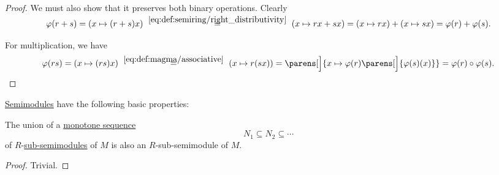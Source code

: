 \begin{proof}
  We must also show that it preserves both binary operations. Clearly
  \begin{equation*}
    \varphi(r + s)
    =
    (x \mapsto (r + s) x)
    \reloset {\eqref{eq:def:semiring/right_distributivity}} =
    (x \mapsto r x + s x)
    =
    (x \mapsto r x) + (x \mapsto s x)
    =
    \varphi(r) + \varphi(s).
  \end{equation*}

  For multiplication, we have
  \begin{equation*}
    \varphi(rs)
    =
    (x \mapsto (rs)x)
    \reloset {\eqref{eq:def:magma/associative}} =
    (x \mapsto r(sx))
    =
    \parens[\Big]{ x \mapsto \varphi(r)\parens[\Big]{ \varphi(s)(x) } }
    =
    \varphi(r) \bincirc \varphi(s).
  \end{equation*}
\end{proof}

\begin{proposition}\label{thm:def:semimodule}
  \hyperref[def:semimodule]{Semimodules} have the following basic properties:
  \begin{thmenum}
     The union of a \hyperref[eq:def:partially_ordered_set/homomorphism/sequence]{monotone sequence}
    \begin{equation*}
      N_1 \subseteq N_2 \subseteq \cdots
    \end{equation*}
    of \( R \)-\hyperref[def:semimodule/submodel]{sub-semimodules} of \( M \) is also an \( R \)-sub-semimodule of \( M \).
  \end{thmenum}
\end{proposition}
\begin{proof}
   Trivial.
\end{proof}

